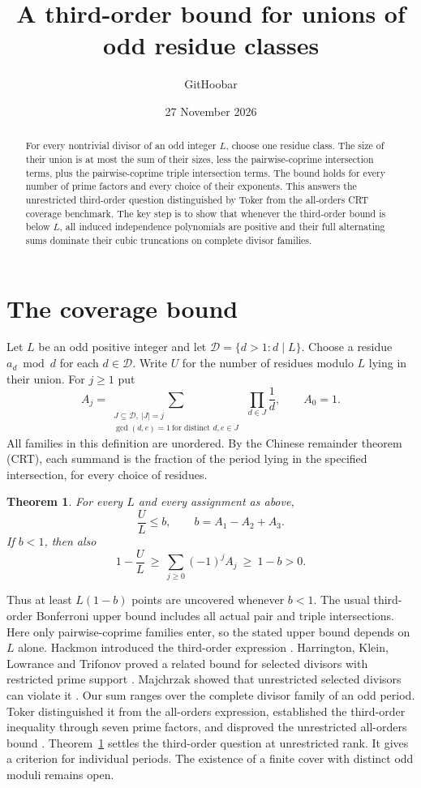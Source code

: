 \documentclass[11pt]{article}
\title{\vspace{-1.3em}A third-order bound for unions of odd residue classes}
\author{GitHoobar}
\date{27 November 2026}
\newtheorem{theorem}{Theorem}
\newcommand{\D}{\mathcal D}
\begin{document}
\maketitle
\begin{abstract}
For every nontrivial divisor of an odd integer \(L\), choose one residue
class. The size of their union is at most the sum of their sizes, less the
pairwise-coprime intersection terms, plus the pairwise-coprime triple
intersection terms. The bound holds for every number of prime factors
and every choice of their exponents. This answers the unrestricted
third-order question distinguished by Toker from the all-orders
CRT coverage benchmark. The key step is to show that whenever the
third-order bound is below \(L\), all induced independence polynomials
are positive and their full alternating sums dominate their cubic truncations
on complete divisor families.
\end{abstract}

\section{The coverage bound}
Let \(L\) be an odd positive integer and let \(\D=\{d>1:d\mid L\}\).
Choose a residue \(a_d\bmod d\) for each \(d\in\D\). Write \(U\) for the
number of residues modulo \(L\) lying in their union. For \(j\geq 1\) put
\[
 A_j=\sum_{\substack{J\subseteq\D,\ |J|=j\\
               \gcd(d,e)=1\ \text{for distinct }d,e\in J}}
               \ \prod_{d\in J}\frac1d,\qquad A_0=1 .
\]
All families in this definition are unordered. By the Chinese remainder
theorem (CRT), each summand is the fraction of the period lying in the
specified intersection, for every choice of residues.

\begin{theorem}\label{thm:main}
For every \(L\) and every assignment as above,
\[
 \frac{U}{L}\le b,\qquad b=A_1-A_2+A_3 .
\]
If \(b<1\), then also
\[
 1-\frac UL\ \geq\ \sum_{j\ge0}(-1)^j A_j\ \geq\ 1-b>0.
\]
\end{theorem}

Thus at least \(L(1-b)\) points are uncovered whenever \(b<1\).
The usual third-order Bonferroni upper bound includes all actual pair
and triple intersections. Here only pairwise-coprime families enter,
so the stated upper bound depends on \(L\) alone.
Hackmon introduced the third-order expression \cite[Definition 2]{hackmon}.
Harrington, Klein, Lowrance and Trifonov proved a related bound for selected
divisors with restricted prime support \cite[Theorem 1.9]{hklt}.
Majchrzak showed that unrestricted selected divisors can violate it
\cite{maj}. Our sum ranges over the complete divisor family of an odd period.
Toker distinguished it from the all-orders expression, established the
third-order inequality through seven prime factors, and disproved the
unrestricted all-orders bound \cite[\S\S 4--5]{toker}.
Theorem~\ref{thm:main} settles the third-order question at unrestricted rank.
It gives a criterion for individual periods. The existence of a finite
cover with distinct odd moduli remains open.
\end{document}
